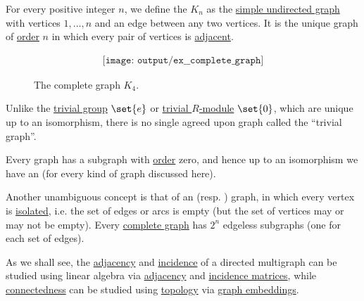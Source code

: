 \begin{example}\label{ex:complete_graph}
  For every positive integer \( n \), we define the  \( K_n \) as the \hyperref[def:undirected_graph]{simple undirected graph} with vertices \( 1, \ldots, n \) and an edge between any two vertices. It is the unique graph of \hyperref[def:graph_cardinality/order]{order} \( n \) in which every pair of vertices is \hyperref[def:graph_adjacency]{adjacent}.

  \begin{figure}[!ht]
    \begin{equation}\label{eq:fig:ex:complete_graph}
      \begin{aligned}
        \texttt{[image: output/ex\_\_complete\_graph]}
      \end{aligned}
    \end{equation}
    \caption{The complete graph \( K_4 \).}\label{fig:ex:complete_graph}
  \end{figure}
\end{example}

\begin{remark}\label{rem:trivial_graph}
  Unlike the \hyperref[def:group/trivial]{trivial group} \( \set{ e } \) or \hyperref[def:module/trivial]{trivial \( R \)-module} \( \set{ 0 } \), which are unique up to an isomorphism, there is no single agreed upon graph called the \enquote{trivial graph}.

  Every graph has a subgraph with \hyperref[def:graph_cardinality/order]{order} zero, and hence up to an isomorphism we have an  (for every kind of graph discussed here).

  Another unambiguous concept is that of an  (resp. ) graph, in which every vertex is \hyperref[def:isolated_vertex]{isolated}, i.e. the set of edges or arcs is empty (but the set of vertices may or may not be empty). Every \hyperref[ex:complete_graph]{complete graph} has \( 2^n \) edgeless subgraphs (one for each set of edges).
\end{remark}

\begin{remark}\label{rem:graphs_linear_algebra_and_topology}
  As we shall see, the \hyperref[def:graph_adjacency]{adjacency} and \hyperref[def:graph_incidence]{incidence} of a directed multigraph can be studied using linear algebra via \hyperref[def:graph_adjacency_matrix]{adjacency} and \hyperref[def:directed_incidence_matrix]{incidence matrices}, while \hyperref[def:graph_connectedness]{connectedness} can be studied using \hyperref[def:graph_connectedness]{topology} via \hyperref[def:graph_geometric_realization/embedding]{graph embeddings}.
\end{remark}

